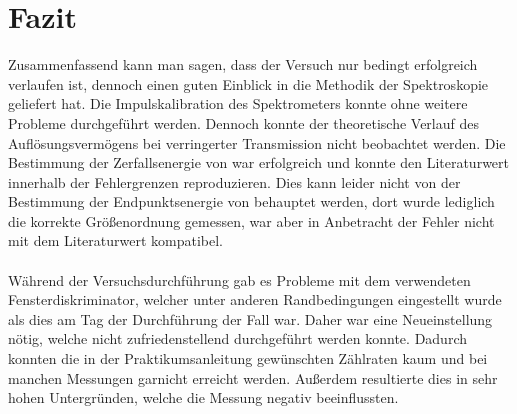 \documentclass[11pt, a4paper]{article}
\numberwithin{equation}{section}
\begin{document}
\section{Fazit}
Zusammenfassend kann man sagen, dass der Versuch nur bedingt erfolgreich verlaufen ist, dennoch einen guten Einblick in die Methodik der Spektroskopie geliefert hat.
Die Impulskalibration des Spektrometers konnte ohne weitere Probleme durchgeführt werden.
Dennoch konnte der theoretische Verlauf des Auflösungsvermögens bei verringerter Transmission nicht beobachtet werden.
Die Bestimmung der Zerfallsenergie von  war erfolgreich und konnte den Literaturwert innerhalb der Fehlergrenzen reproduzieren.
Dies kann leider nicht von der Bestimmung der Endpunktsenergie von  behauptet werden, dort wurde lediglich die korrekte Größenordnung gemessen, war aber in Anbetracht der Fehler nicht mit dem Literaturwert kompatibel.\\
\\
Während der Versuchsdurchführung gab es Probleme mit dem verwendeten Fensterdiskriminator, welcher unter anderen Randbedingungen eingestellt wurde als dies am Tag der Durchführung der Fall war.
Daher war eine Neueinstellung nötig, welche nicht zufriedenstellend durchgeführt werden konnte.
Dadurch konnten die in der Praktikumsanleitung gewünschten Zählraten kaum und bei manchen Messungen garnicht erreicht werden.
Außerdem resultierte dies in sehr hohen Untergründen, welche die Messung negativ beeinflussten.
\end{document}
